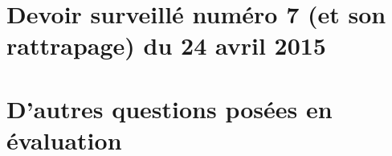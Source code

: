 \section{Devoir surveillé numéro 7 (et son rattrapage) du 24 avril 2015}



\section{D'autres questions posées en évaluation}

